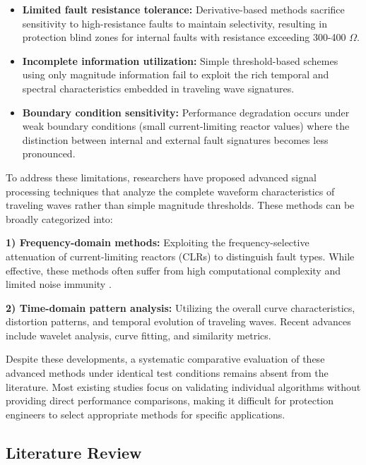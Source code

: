 \documentclass[journal]{IEEEtran}
\begin{document}
\begin{itemize}
    \item \textbf{Limited fault resistance tolerance:} Derivative-based methods sacrifice sensitivity to high-resistance faults to maintain selectivity, resulting in protection blind zones for internal faults with resistance exceeding 300-400 $\Omega$.
    
    \item \textbf{Incomplete information utilization:} Simple threshold-based schemes using only magnitude information fail to exploit the rich temporal and spectral characteristics embedded in traveling wave signatures.
    
    \item \textbf{Boundary condition sensitivity:} Performance degradation occurs under weak boundary conditions (small current-limiting reactor values) where the distinction between internal and external fault signatures becomes less pronounced.
    
\end{itemize}

To address these limitations, researchers have proposed advanced signal processing techniques that analyze the complete waveform characteristics of traveling waves rather than simple magnitude thresholds. These methods can be broadly categorized into:

\textbf{1) Frequency-domain methods:} Exploiting the frequency-selective attenuation of current-limiting reactors (CLRs) to distinguish fault types. While effective, these methods often suffer from high computational complexity and limited noise immunity \cite{li2018fast}.

\textbf{2) Time-domain pattern analysis:} Utilizing the overall curve characteristics, distortion patterns, and temporal evolution of traveling waves. Recent advances include wavelet analysis, curve fitting, and similarity metrics.

Despite these developments, a systematic comparative evaluation of these advanced methods under identical test conditions remains absent from the literature. Most existing studies focus on validating individual algorithms without providing direct performance comparisons, making it difficult for protection engineers to select appropriate methods for specific applications.

\subsection{Literature Review}
\end{document}
